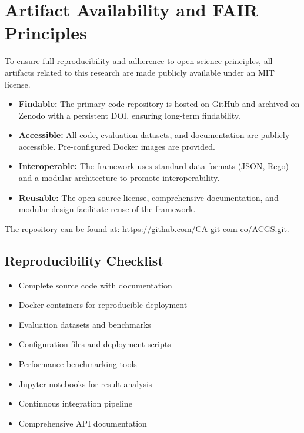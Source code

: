 \section{Artifact Availability and FAIR Principles}\label{sec:appendix_artifacts}
To ensure full reproducibility and adherence to open science principles, all artifacts related to this research are made publicly available under an MIT license.

\begin{itemize}[leftmargin=*,topsep=0pt,itemsep=2pt,parsep=0pt]
    \item \textbf{Findable:} The primary code repository is hosted on GitHub and archived on Zenodo with a persistent DOI, ensuring long-term findability.
    \item \textbf{Accessible:} All code, evaluation datasets, and documentation are publicly accessible. Pre-configured Docker images are provided.
    \item \textbf{Interoperable:} The framework uses standard data formats (JSON, Rego) and a modular architecture to promote interoperability.
    \item \textbf{Reusable:} The open-source license, comprehensive documentation, and modular design facilitate reuse of the framework.
\end{itemize}

The repository can be found at: \url{https://github.com/CA-git-com-co/ACGS.git}.

\subsection{Reproducibility Checklist}
\begin{itemize}[leftmargin=*,topsep=0pt,itemsep=2pt,parsep=0pt]
    \item[\checkmarkcustom{}] Complete source code with documentation
    \item[\checkmarkcustom{}] Docker containers for reproducible deployment
    \item[\checkmarkcustom{}] Evaluation datasets and benchmarks
    \item[\checkmarkcustom{}] Configuration files and deployment scripts
    \item[\checkmarkcustom{}] Performance benchmarking tools
    \item[\checkmarkcustom{}] Jupyter notebooks for result analysis
    \item[\checkmarkcustom{}] Continuous integration pipeline
    \item[\checkmarkcustom{}] Comprehensive API documentation
\end{itemize}
